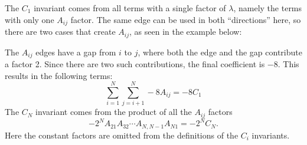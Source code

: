 \documentclass[english,master]{liumaiex}
\theoremstyle{thesisplain}
\theoremstyle{thesisdefinition}
\numberwithin{equation}{section}
\newcommand{\dotposition}[1]{
    ({360/\n * (#1) + 90}:\radius)
}
\begin{document}
The $C_1$ invariant comes from all terms with a single factor of $\lambda$, namely the terms with only one $A_{ij}$ factor. The same edge can be used in both ``directions'' here, so there are two cases that create $A_{ij}$, as seen in the example below:
\begin{center}
\qquad
{}
\end{center}
The $A_{ij}$ edges have a gap from $i$ to $j$, where both the edge and the gap contribute a factor 2. Since there are two such contributions, the final coefficient is $-8$. This results in the following terms:
\begin{equation}
	\sum_{i=1}^{N} \sum_{j=i+1}^N -8 A_{ij} = -8 C_1
\end{equation}
The $C_N$ invariant comes from the product of all the $A_{ij}$ factors
\begin{equation}
	-2^N A_{21}A_{32}\cdots A_{N,N-1}A_{N1} = -2^N C_N.
\end{equation}
Here the constant factors are omitted from the definitions of the $C_i$ invariants.
\end{document}
